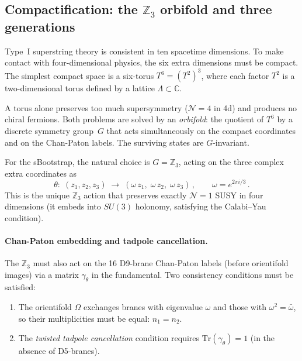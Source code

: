\documentclass[12pt,a4paper]{article}
\begin{document}
\subsection{Compactification: the $\mathbb{Z}_3$ orbifold and three
generations}

Type~I superstring theory is consistent in ten spacetime dimensions.
To make contact with four-dimensional physics, the six extra dimensions
must be compact.  The simplest compact space is a six-torus
$T^6 = (T^2)^3$, where each factor $T^2$ is a two-dimensional torus
defined by a lattice $\Lambda \subset \mathbb{C}$.

A torus alone preserves too much supersymmetry ($\mathcal{N}=4$ in
4d) and produces no chiral fermions.  Both problems are solved by an
\emph{orbifold}: the quotient of $T^6$ by a discrete symmetry
group~$G$ that acts simultaneously on the compact coordinates and on
the Chan-Paton labels.  The surviving states are $G$-invariant.

For the sBootstrap, the natural choice is $G = \mathbb{Z}_3$, acting
on the three complex extra coordinates as
\begin{equation}
  \theta:\; (z_1, z_2, z_3)
  \;\longrightarrow\;
  (\omega\, z_1,\; \omega\, z_2,\; \omega\, z_3)\,,
  \qquad \omega = e^{2\pi i/3}\,.
\end{equation}
This is the unique $\mathbb{Z}_3$ action that preserves exactly
$\mathcal{N}=1$ SUSY in four dimensions (it embeds into $SU(3)$
holonomy, satisfying the Calabi--Yau condition).

\paragraph{Chan-Paton embedding and tadpole cancellation.}
The $\mathbb{Z}_3$ must also act on the 16 D9-brane Chan-Paton labels
(before orientifold images) via a matrix $\gamma_\theta$ in the
fundamental.  Two consistency conditions must be satisfied:
\begin{enumerate}
\item The orientifold $\Omega$ exchanges branes with eigenvalue
$\omega$ and those with $\omega^2 = \bar\omega$, so their
multiplicities must be equal: $n_1 = n_2$.
\item The \emph{twisted tadpole cancellation} condition requires
$\mathrm{Tr}(\gamma_\theta) = 1$ (in the absence of D5-branes).
\end{enumerate}
\end{document}
